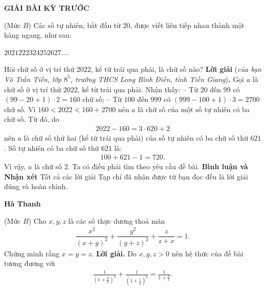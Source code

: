\centerline{{\large{\textbf{\color{thachthuctoanhoc}GIẢI BÀI KỲ TRƯỚC}}}}
\vspace*{-5pt}
\begin{multicols}{2}
	\setlength{\abovedisplayskip}{4pt}
	\setlength{\belowdisplayskip}{4pt}
	{}
	(Mức $B$) Các số tự nhiên, bắt đầu từ $20$, được viết liên tiếp nhau thành một hàng ngang, như sau:
	\vskip 0.05cm
	\columnbreak
	\centerline{$2021222324252627\ldots.$}
	Hỏi chữ số ở vị trí thứ $2022$, kể từ trái qua phải, là chữ số nào?
	\vskip 0.05cm
	\textbf{\color{thachthuctoanhoc}Lời giải} (\textit{của bạn Võ Trần Tiến, lớp $8^5$, trường THCS Long Bình Điền, tỉnh Tiền Giang})\textbf{\color{thachthuctoanhoc}.}
	\vskip 0.05cm
	Gọi $a$ là chữ số ở vị trí thứ $2022$, kể từ trái qua phải.
	\vskip 0.05cm
	Nhận thấy:
	\vskip 0.05cm
	-- Từ $20$ đến $99$ có $(99-20 + 1) \cdot 2 = 160$ chữ số;
	\vskip 0.05cm
	-- Từ $100$ đến $999$ có  $(999 -100+1)\cdot 3 = 2700$ chữ số.
	\vskip 0.05cm
	Vì $160 < 2022 < 160 + 2700$ nên $a$ là chữ số của một số tự nhiên có ba chữ số.
	\vskip 0.05cm
	Từ đó, do
	\begin{align*}
		2022 - 160 = 3 \cdot 620 + 2
	\end{align*}
	nên $a$ là chữ số thứ hai (kể từ trái qua phải) của số tự nhiên có ba chữ số thứ $621$.
	\vskip 0.05cm
	Số tự nhiên có ba chữ số thứ $621$ là:
	\begin{align*}
		100 + 621 - 1 = 720.
	\end{align*}
	Vì vậy, $a$ là chữ số $2$.
	\vskip 0.05cm
	Ta có điều phải tìm theo yêu cầu đề bài.
	\vskip 0.05cm
	\textbf{\color{thachthuctoanhoc}Bình luận và Nhận xét}
	\vskip 0.05cm	
	Tất cả các lời giải Tạp chí đã nhận được từ bạn đọc đều là lời giải đúng và hoàn chỉnh.
	\begin{flushright}
		\textbf{\color{thachthuctoanhoc}Hà Thanh}
	\end{flushright}
	{}
	(Mức $B$) Cho $x,y,z$ là các số thực dương thoả mãn 
	\begin{align*}
		\dfrac{x^2}{(x+y)^2}+\dfrac{y^2}{(y+z)^2}+\dfrac z{z+x}=1.
	\end{align*}
	Chứng minh rằng $x=y=z$. 
	\vskip 0.05cm
	\textbf{\color{thachthuctoanhoc}Lời giải.}
	Do $x, y, z > 0$ nên hệ thức của đề bài tương đương với
	\begin{align*}
		\frac{1}{{{{\left( {1 + \frac{y}{x}} \right)}^2}}} + \frac{1}{{{{\left( {1 + \frac{z}{y}} \right)}^2}}} = \frac{1}{{1 + \frac{z}{x}}}.\tag{$1$}
	\end{align*}

\end{multicols}

